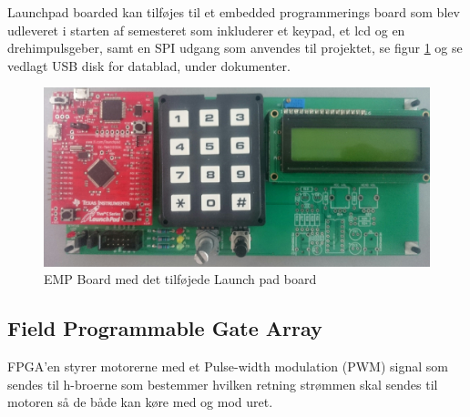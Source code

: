 Launchpad boarded kan tilføjes til et embedded programmerings board som blev udleveret i starten af semesteret som inkluderer et keypad, et lcd og en drehimpulsgeber, samt en SPI udgang som anvendes til projektet, se figur \ref{fig:EMP_BOARD} og se vedlagt USB disk for datablad, under dokumenter.

\begin{figure}[!ht]
	\begin{center}
		\includegraphics[scale=0.1, angle =0]{Billeder/EMP_BOARD.JPG}
	\end{center}
\caption{EMP Board med det tilføjede Launch pad board}
\label{fig:EMP_BOARD}
\end{figure}

\subsection{Field Programmable Gate Array}

FPGA'en styrer motorerne med et Pulse-width modulation (PWM) signal som sendes til h-broerne som bestemmer hvilken retning strømmen skal sendes til motoren så de både kan køre med og mod uret.


